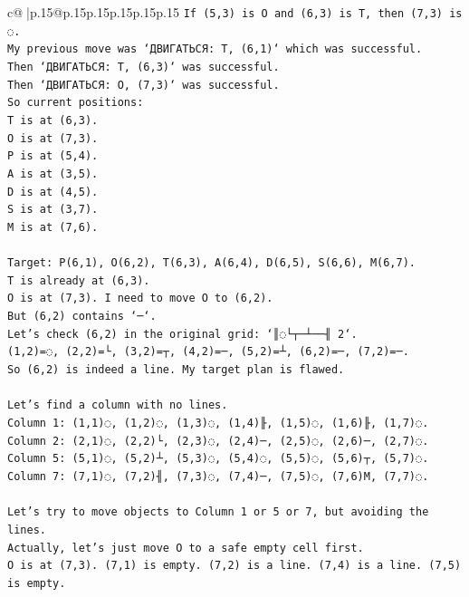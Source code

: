 \documentclass{article}
\begin{document}
{\begin{supertabular}{c@{$\;$}|p{.15\linewidth}@{}p{.15\linewidth}p{.15\linewidth}p{.15\linewidth}p{.15\linewidth}p{.15\linewidth}}
{{{\texttt{If (5,3) is O and (6,3) is T, then (7,3) is ◌.} \\
\texttt{My previous move was `ДВИГАТЬСЯ: T, (6,1)` which was successful.} \\
\texttt{Then `ДВИГАТЬСЯ: T, (6,3)` was successful.} \\
\texttt{Then `ДВИГАТЬСЯ: O, (7,3)` was successful.} \\
\texttt{So current positions:} \\
\texttt{T is at (6,3).} \\
\texttt{O is at (7,3).} \\
\texttt{P is at (5,4).} \\
\texttt{A is at (3,5).} \\
\texttt{D is at (4,5).} \\
\texttt{S is at (3,7).} \\
\texttt{M is at (7,6).} \\
\\ 
\texttt{Target: P(6,1), O(6,2), T(6,3), A(6,4), D(6,5), S(6,6), M(6,7).} \\
\texttt{T is already at (6,3).} \\
\texttt{O is at (7,3). I need to move O to (6,2).} \\
\texttt{But (6,2) contains `─`.} \\
\texttt{Let's check (6,2) in the original grid: `║◌└┬─┴──╢ 2`.} \\
\texttt{(1,2)=◌, (2,2)=└, (3,2)=┬, (4,2)=─, (5,2)=┴, (6,2)=─, (7,2)=─.} \\
\texttt{So (6,2) is indeed a line. My target plan is flawed.} \\
\\ 
\texttt{Let's find a column with no lines.} \\
\texttt{Column 1: (1,1)◌, (1,2)◌, (1,3)◌, (1,4)╟, (1,5)◌, (1,6)╟, (1,7)◌.} \\
\texttt{Column 2: (2,1)◌, (2,2)└, (2,3)◌, (2,4)─, (2,5)◌, (2,6)─, (2,7)◌.} \\
\texttt{Column 5: (5,1)◌, (5,2)┴, (5,3)◌, (5,4)◌, (5,5)◌, (5,6)┬, (5,7)◌.} \\
\texttt{Column 7: (7,1)◌, (7,2)╢, (7,3)◌, (7,4)─, (7,5)◌, (7,6)M, (7,7)◌.} \\
\\ 
\texttt{Let's try to move objects to Column 1 or 5 or 7, but avoiding the lines.} \\
\texttt{Actually, let's just move O to a safe empty cell first.} \\
\texttt{O is at (7,3). (7,1) is empty. (7,2) is a line. (7,4) is a line. (7,5) is empty.} \\
}}}
\end{supertabular}}
\end{document}
